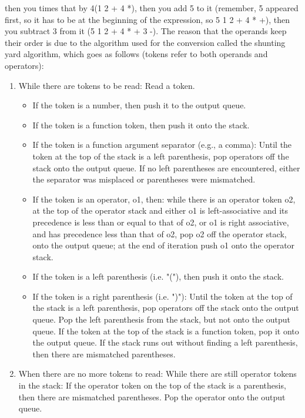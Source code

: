 then you times that by 4(1 2 + 4 *), then you add 5 to it (remember, 5 appeared first, so it has to be at the beginning of the expression, so 5 1 2 + 4 * +), then you subtract 3 from it (5 1 2 + 4 * + 3 -). The reason that the operands keep their order is due to the algorithm used for the conversion called the shunting yard algorithm, which goes as follows (tokens refer to both operands and operators):
\begin{enumerate}
	\item While there are tokens to be read:
		\subitem Read a token.
		\begin{itemize}
		\item If the token is a number, then push it to the output queue.
		\item If the token is a function token, then push it onto the stack.
		\item If the token is a function argument separator (e.g., a comma):
			\subitem Until the token at the top of the stack is a left parenthesis, pop operators off the stack onto the output queue. If no left parentheses are encountered, either the separator was misplaced or parentheses were mismatched.
		\item If the token is an operator, o1, then:
			\subitem while there is an operator token o2, at the top of the operator stack and either
				o1 is left-associative and its precedence is less than or equal to that of o2, or
				o1 is right associative, and has precedence less than that of o2,
					\subsubitem pop o2 off the operator stack, onto the output queue;
			at the end of iteration push o1 onto the operator stack.
		\item If the token is a left parenthesis (i.e. "("), then push it onto the stack.
		\item If the token is a right parenthesis (i.e. ")"):
			\subitem Until the token at the top of the stack is a left parenthesis, pop operators off the stack onto the output queue.
			\subitem Pop the left parenthesis from the stack, but not onto the output queue.
			\subitem If the token at the top of the stack is a function token, pop it onto the output queue.
			\subitem If the stack runs out without finding a left parenthesis, then there are mismatched parentheses.
		\end{itemize}
	\item When there are no more tokens to read:
		\subitem While there are still operator tokens in the stack:
			\subsubitem If the operator token on the top of the stack is a parenthesis, then there are mismatched parentheses.
			\subsubitem Pop the operator onto the output queue.
\end{enumerate}

